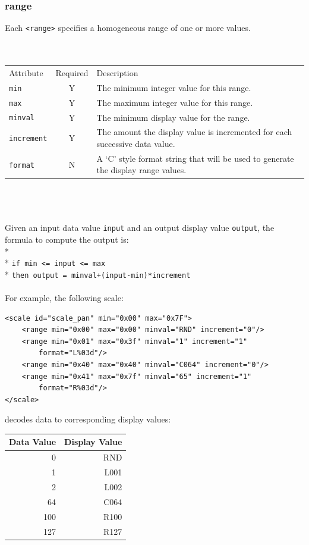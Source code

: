 \documentclass[a4paper,twoside,12pt]{article}
\newcommand{\code}[1]{\color{red}\texttt{#1}\color{black}}
\begin{document}
\subsubsection{range}
Each \code{<range>}{} specifies a homogeneous range of one or more
values.
\\
\\
\\
\begin{tabular}{|l|c|p{9cm}|}
\hline
Attribute & Required & Description \\
\code{min} & Y & The minimum integer value for this range. \\
\code{max} & Y & The maximum integer value for this range. \\
\code{minval} & Y & The minimum display value for the range. \\
\code{increment} & Y & The amount the display value is incremented
for each successive data value. \\
\code{format} & N & A `C' style format string that will be used to
generate the display range values. \\
\hline
\end{tabular}
\\
\\
\\
Given an input data value \code{input}{} and an output display
value \code{output}, the formula to compute the output is: \\*
\\*
\code{if min~<=~input~<=~max} \\*
\code{then output~=~minval+(input-min)*increment} \\
\\
For example, the following scale:
\begin{verbatim}
<scale id="scale_pan" min="0x00" max="0x7F">
    <range min="0x00" max="0x00" minval="RND" increment="0"/>
    <range min="0x01" max="0x3f" minval="1" increment="1"
        format="L%03d"/>
    <range min="0x40" max="0x40" minval="C064" increment="0"/>
    <range min="0x41" max="0x7f" minval="65" increment="1"
        format="R%03d"/>
</scale>
\end{verbatim}
decodes data to corresponding display values:
\begin{tabular}{|r|r|} \hline
Data Value & Display Value \\
\hline
0 & RND \\
1 & L001 \\
2 & L002 \\
64 & C064 \\
100 & R100 \\
127 & R127 \\
\hline
\end{tabular}
\end{document}
